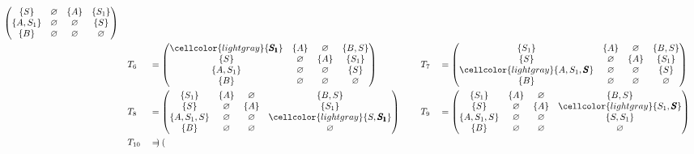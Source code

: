 \begin{example}
{\begin{alignat*}{7}
\begin{pmatrix}
\{S\}       & \varnothing & \{A\}       & \{S_1\}     \\
\{A, S_1\}  & \varnothing & \varnothing & \{S\}       \\
\{B\}       & \varnothing & \varnothing & \varnothing \\
\end{pmatrix} \\ & &&T_6 &&= \begin{pmatrix}
\cellcolor{lightgray} \{\pmb{S_1}\}     & \{A\}       & \varnothing & \{B, S\}    \\
\{S\}       & \varnothing & \{A\}       & \{S_1\}     \\
\{A, S_1\}  & \varnothing & \varnothing & \{S\}       \\
\{B\}       & \varnothing & \varnothing & \varnothing \\
\end{pmatrix} \ \ \ \ &&T_7 &&= \begin{pmatrix}
\{S_1\}     & \{A\}       & \varnothing & \{B, S\}    \\
\{S\}       & \varnothing & \{A\}       & \{S_1\}     \\
\cellcolor{lightgray} \{A, S_1, \pmb{S}\}  & \varnothing & \varnothing & \{S\}    \\
\{B\}       & \varnothing & \varnothing & \varnothing \\
\end{pmatrix}  \\
& &&T_8 &&= \begin{pmatrix}
\{S_1\}     & \{A\}       & \varnothing & \{B, S\}    \\
\{S\}       & \varnothing & \{A\}       & \{S_1\}     \\
\{A, S_1, S\}  & \varnothing & \varnothing & \cellcolor{lightgray} \{S, \pmb{S_1}\} \\
\{B\}       & \varnothing & \varnothing & \varnothing \\
\end{pmatrix} \ \ \ \ &&T_9 &&= \begin{pmatrix}
\{S_1\}     & \{A\}       & \varnothing & \{B, S\}    \\
\{S\}       & \varnothing & \{A\}       & \cellcolor{lightgray} \{S_1, \pmb{S}\}     \\
\{A, S_1, S\}  & \varnothing & \varnothing & \{S, S_1\} \\
\{B\}       & \varnothing & \varnothing & \varnothing \\
\end{pmatrix} \\ & &&T_{10} &&= \begin{pmatrix}

\end{pmatrix}
\end{alignat*}}
\end{example}
